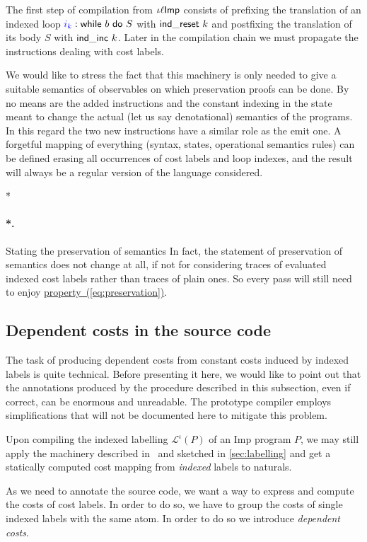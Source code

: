\documentclass[submission,copyright,creativecommons]{eptcs}
\makeatletter
\theoremstyle{definition}
\newcommand{\s}[1]{{\sf #1}}    \newcommand{\vc}[1]{{\bf #1}}
\newcommand{\imp}{{\sf Imp}}            \newcommand{\vm}{{\sf Vm}}              \newcommand{\mips}{{\sf Mips}}          \newcommand{\Clight}{{\sf Clight}}        \newcommand{\Cminor}{{\sf Cminor}}
\newcommand{\sop}[1]{\s{#1}\ }
\newcommand{\Ell}{\mathcal L}
\def\lbl#1:{\mbox{\color{blue}$#1$}:}
\let\oldparagraph\paragraph
\def\paragraph{\@ifnextchar*\new@paragraph@star\new@paragraph}
\def\new@paragraph@star*#1{\oldparagraph*{#1.}}
\def\new@paragraph#1{\oldparagraph{#1.}}
\makeatother
\begin{document}
The first step of compilation from $\iota\ell\imp$ consists of prefixing the translation of an indexed loop $\lbl{i_k}:\s{while}\ b\ \s{do}\ S$ with $\sop{ind\_reset}k$ and postfixing the translation of its body $S$ with $\sop{ind\_inc}k$.
Later in the compilation chain we must propagate the instructions dealing with cost labels.

We would like to stress the fact that this machinery is only needed to give a suitable semantics of observables on which preservation proofs can be done.
By no means are the added instructions and the constant indexing in the state meant to change the actual (let us say denotational) semantics of the programs.
In this regard the two new instructions have a similar role as the \s{emit} one.
A forgetful mapping of everything (syntax, states, operational semantics rules) can be defined erasing all occurrences of cost labels and loop indexes, and the result will always be a regular version of the language considered.

\paragraph*{Stating the preservation of semantics}
In fact, the statement of preservation of semantics does not change at all, if not for considering traces of evaluated indexed cost labels rather than traces of plain ones. So every pass will still need to enjoy
\hyperref[eq:preservation]{property~(\ref*{eq:preservation})}.

\subsection{Dependent costs in the source code}
\label{ssec:depcosts}\label{ssec4}
The task of producing dependent costs from constant costs induced by indexed labels is quite technical.
Before presenting it here, we would like to point out that the annotations produced by the procedure described in this subsection, even if correct, can be enormous and unreadable. The prototype compiler employs simplifications that will not be documented here to mitigate this problem.

Upon compiling the indexed labelling $\Ell^\iota(P)$ of an
\imp{} program $P$, we may still apply the machinery described in~\cite{labeling}
and sketched in \autoref{sec:labelling} and get a statically computed cost
mapping from \emph{indexed} labels to naturals.

As we need to annotate the source code, we want a way to express and
compute the costs of cost labels. In order to do so, we have to group
the costs of single indexed labels with the same atom.
In order to do so we introduce \emph{dependent costs}.
\end{document}
